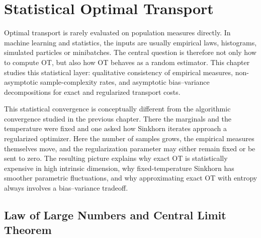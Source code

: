 
\chapter{Statistical Optimal Transport}
\label{sec-statistical-ot}

Optimal transport is rarely evaluated on population measures directly. In machine learning and statistics, the inputs are usually empirical laws, histograms, simulated particles or minibatches. The central question is therefore not only how to compute OT, but also how OT behaves as a random estimator. This chapter studies this statistical layer: qualitative consistency of empirical measures, non-asymptotic sample-complexity rates, and asymptotic bias--variance decompositions for exact and regularized transport costs.

This statistical convergence is conceptually different from the algorithmic convergence studied in the previous chapter. There the marginals and the temperature were fixed and one asked how Sinkhorn iterates approach a regularized optimizer. Here the number of samples grows, the empirical measures themselves move, and the regularization parameter may either remain fixed or be sent to zero. The resulting picture explains why exact OT is statistically expensive in high intrinsic dimension, why fixed-temperature Sinkhorn has smoother parametric fluctuations, and why approximating exact OT with entropy always involves a bias--variance tradeoff.

\section{Law of Large Numbers and Central Limit Theorem}
\label{sec-law-large-numbers-clt}
\label{sec-quantitative-clt}

